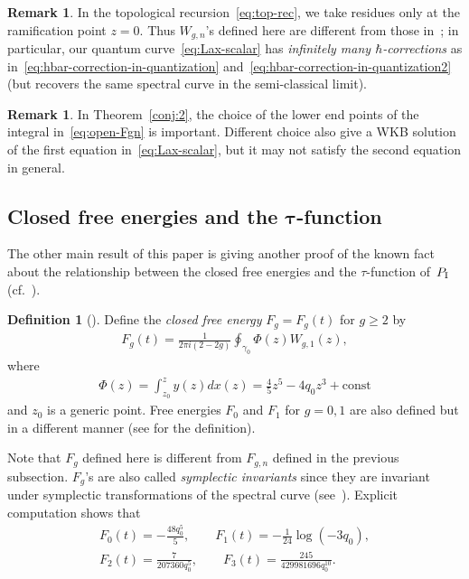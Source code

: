 \documentclass[pdftex]{sigma}
\theoremstyle{definition}
\newtheorem{Def}[thm]{Definition}
\newtheorem{rem}[thm]{Remark}
\numberwithin{equation}{section}
\def\PI{P_{\rm I}}
\begin{document}
\begin{rem}
In the topological recursion~\eqref{eq:top-rec},
we take residues only at the ramif\/ication point $z = 0$.
Thus $W_{g,n}$'s def\/ined here
are dif\/ferent from those in~\cite{DM14-2};
in particular, our quantum curve~\eqref{eq:Lax-scalar}
has {\em infinitely many $\hbar$-corrections} as in~\eqref{eq:hbar-correction-in-quantization} and~\eqref{eq:hbar-correction-in-quantization2}
(but recovers the same spectral curve in the semi-classical limit).
\end{rem}

\begin{rem}
In Theorem~\ref{conj:2}, the choice of the lower end points
of the integral in~\eqref{eq:open-Fgn} is important.
Dif\/ferent choice also give a WKB solution of the f\/irst equation
in~\eqref{eq:Lax-scalar}, but it may not satisfy
the second equation in general.
\end{rem}



\subsection[Closed free energies and the $\tau$-function]{Closed free energies and the $\boldsymbol{\tau}$-function}

The other main result of this paper is giving
another proof of the known fact
about the relationship between the closed free energies
and the $\tau$-function of~$\PI$
(cf.~\cite{DGZJ,EO07}).


\begin{Def}[]
Def\/ine the {\em closed free energy}
$F_{g} = F_{g}(t)$ for $g \ge 2$ by
\begin{gather*}
F_{g}(t) = \frac{1}{2\pi i (2-2g)}
\oint_{\gamma_{0}} \Phi(z) W_{g,1}(z),
\end{gather*}
where
\begin{gather*}
\Phi(z) = \int^{z}_{z_{0}} y(z)dx(z)
  = \frac{4}{5}z^{5} - 4q_{0} z^{3} +
\text{const}
\end{gather*}
and $z_{0}$ is a generic point.
Free energies $F_{0}$ and $F_{1}$ for $g = 0, 1$
are also def\/ined but in a dif\/ferent manner
(see \cite[Sections~4.2.2 and~4.2.3]{EO07} for the def\/inition).
\end{Def}

Note that $F_g$ def\/ined here is dif\/ferent from $F_{g,n}$
def\/ined in the previous subsection.
$F_g$'s are also called {\it symplectic invariants}
since they are invariant under symplectic transformations
of the spectral curve (see~\cite{EO07}).
Explicit computation shows that
\begin{gather*}
F_{0}(t)   =   -\frac{48 q_{0}^{5}}{5},
\qquad
F_{1}(t)   =   -\frac{1}{24} \log(-3q_{0}), \\
F_{2}(t)   =   \frac{7}{207360 q_{0}^{5}},
\qquad
F_{3}(t)   =   \frac{245}{429981696 q_{0}^{10}}.
\end{gather*}
\end{document}
